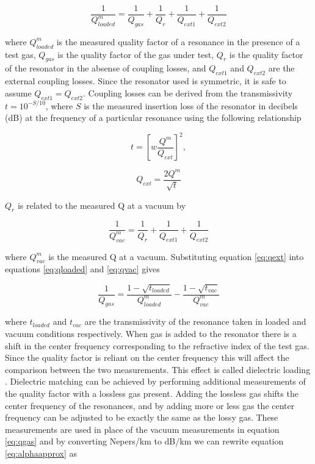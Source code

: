\begin{equation} \label{eq:qloaded}
\frac{1}{Q_{loaded}^m} = \frac{1}{Q_{gas}} + \frac{1}{Q_{r}} + \frac{1}{Q_{ext1}} +\frac{1}{Q_{ext2}}
\end{equation}

\noindent where $Q_{loaded}^m$ is the measured quality factor of a resonance in the presence of a test gas, $Q_{gas}$ is the quality factor of the gas under test, $Q_{r}$ is the quality factor of the resonator in the absense of coupling losses, and $Q_{ext1}$ and $Q_{ext2}$ are the external coupling losses. Since the resonator used is symmetric, it is safe to assume $Q_{ext1} = Q_{ext2}$. Coupling losses can be derived from the transmissivity $t = 10^{-S/10}$, where $S$ is the measured insertion loss of the resonator in decibels (dB) at the frequency of a particular resonance using the following relationship

\begin{equation} \label{eq:t}
t = \left[ w \frac{Q^m}{Q_{ext}} \right]^2,
\end{equation}

\begin{equation} \label{eq:qext}
Q_{ext} = \frac{2Q^m}{\sqrt{t}}
\end{equation}

\noindent $Q_r$ is related to the measured Q at a vacuum by

\begin{equation}\label{eq:qvac}
\frac{1}{Q_{vac}^m} =  \frac{1}{Q_{r}} + \frac{1}{Q_{ext1}} +\frac{1}{Q_{ext2}}
\end{equation}

\noindent where $Q_{vac}^m$ is the measured Q at a vacuum. Substituting equation \ref{eq:qext} into equations \ref{eq:qloaded} and \ref{eq:qvac} gives

\begin{equation}\label{eq:qgas}
\frac{1}{Q_{gas}} = \frac{1 - \sqrt{t_{loaded}}}{Q^m_{loaded}} - \frac{1-\sqrt{t_{vac}}}{Q_{vac}^m}
\end{equation}

\noindent where $t_{loaded}$ and $t_{vac}$ are the transmissivity of the resonance taken in loaded and vacuum conditions respectively. When gas is added to the resonator there is a shift in the center frequency corresponding to the refractive index of the test gas. Since the quality factor is reliant on the center frequency this will affect the comparison between the two measurements. This effect is called dielectric loading \cite{Deboer-1993}. Dielectric matching can be achieved by performing additional measurements of the quality factor with a lossless gas present. Adding the lossless gas shifts the center frequency of the resonances, and by adding more or less gas the center frequency can be adjusted to be exactly the same as the lossy gas. These measurements are used in place of the vacuum measurements in equation \ref{eq:qgas} and by converting Nepers/km to dB/km we can rewrite equation \ref{eq:alphaapprox} as

